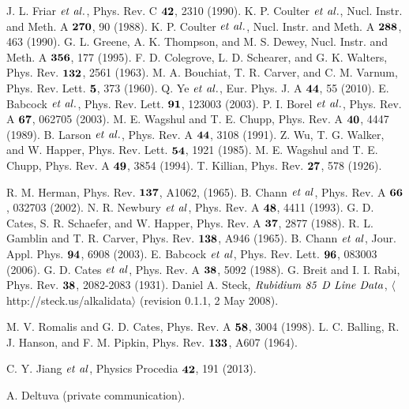 \documentclass[12pt,a4j,openany,report]{jsbook}
\begin{document}
\begin{thebibliography}{99}
 J. L. Friar $\it et~al.$, Phys. Rev. C $\bf 42$, 2310 (1990).
 K. P. Coulter $\it et~al.$, Nucl. Instr. and Meth. A $\bf 270$, 90 (1988).
 K. P. Coulter $\it et~al.$, Nucl. Instr. and Meth. A $\bf 288$, 463 (1990).
 G. L. Greene, A. K. Thompson, and M. S. Dewey, Nucl. Instr. and Meth. A $\bf 356$, 177 (1995).
 F. D. Colegrove, L. D. Schearer, and G. K. Walters, Phys. Rev. $\bf 132$, 2561 (1963).
 M. A. Bouchiat, T. R. Carver, and C. M. Varnum, Phys. Rev. Lett. $\bf 5$, 373 (1960).
 Q. Ye $\it et~al.$,  Eur. Phys. J. A $\bf 44$, 55 (2010).
 E. Babcock $\it et~al.$, Phys. Rev. Lett. $\bf 91$, 123003 (2003).
 P. I. Borel $\it et~al.$, Phys. Rev. A $\bf 67$, 062705 (2003).
M. E. Wagshul and T. E. Chupp, Phys. Rev. A $\bf 40$, 4447 (1989).
 B. Larson $\it et~al.$, Phys. Rev. A $\bf 44$, 3108 (1991).
 Z. Wu, T. G. Walker, and W. Happer, Phys. Rev. Lett. $\bf 54$, 1921 (1985).
 M. E. Wagshul and T. E. Chupp, Phys. Rev. A $\bf 49$, 3854 (1994).
 T. Killian, Phys. Rev. $\bf 27$, 578 (1926).
 
 R. M. Herman, Phys. Rev. $\bf 137$, A1062, (1965).
 B. Chann $\it et~al$, Phys. Rev. A $\bf 66$, 032703 (2002).
 N. R. Newbury $\it et~al$, Phys. Rev. A $\bf 48$, 4411 (1993).
 G. D. Cates, S. R. Schaefer, and W. Happer, Phys. Rev. A $\bf 37$, 2877 (1988).
 R. L. Gamblin and T. R. Carver, Phys. Rev. $\bf 138$, A946 (1965).
 B. Chann $\it et~al$, Jour. Appl. Phys. $\bf 94$, 6908 (2003).
 E. Babcock $\it et~al$, Phys. Rev. Lett. $\bf 96$, 083003 (2006).
 G. D. Cates $\it et~al$, Phys. Rev. A $\bf 38$, 5092 (1988).
 G. Breit and I. I. Rabi, Phys. Rev. $\bf 38$, 2082-2083 (1931).
 Daniel A. Steck, $\it Rubidium~85~D~Line~Data$, $\langle$http://steck.us/alkalidata$\rangle$ (revision 0.1.1, 2 May 2008).
 
 M. V. Romalis and G. D. Cates, Phys. Rev. A $\bf 58$, 3004 (1998).
 L. C. Balling, R. J. Hanson, and F. M. Pipkin, Phys. Rev. $\bf 133$, A607 (1964).

 C. Y. Jiang $\it et~al$, Physics Procedia $\bf 42$, 191 (2013).



 A. Deltuva (private communication).

 
\end{thebibliography}
\end{document}

